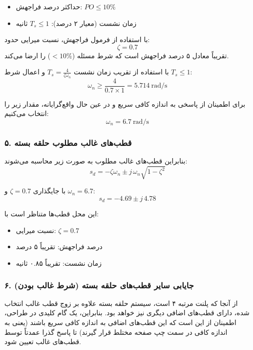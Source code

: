 \documentclass[a4paper]{article}
\begin{document}
\begin{itemize}
	\item حداکثر درصد فراجهش: $PO \le 10\%$
	\item زمان نشست (معیار ۲ درصد): $T_s \le 1$ ثانیه
\end{itemize}

با استفاده از فرمول فراجهش، نسبت میرایی حدود:
\[
\zeta = 0.7
\]
تقریباً معادل ۵ درصد فراجهش است که شرط مسئله ($<10\%$) را ارضا می‌کند.

با استفاده از تقریب زمان نشست $T_s = \frac{4}{\zeta \omega_n}$ و اعمال شرط $T_s \le 1$:
\[
\omega_n \ge \frac{4}{0.7 \times 1} = 5.714 \ \text{rad/s}
\]

برای اطمینان از پاسخی به اندازه کافی سریع و در عین حال واقع‌گرایانه، مقدار زیر را انتخاب می‌کنیم:
\[
\omega_n = 6.7 \ \text{rad/s}
\]

\subsubsection*{۵. قطب‌های غالب مطلوب حلقه بسته}

بنابراین قطب‌های غالب مطلوب به صورت زیر محاسبه می‌شوند:
\[
s_d = -\zeta \omega_n \pm j\,\omega_n\sqrt{1-\zeta^2}
\]

با جایگذاری $\zeta = 0.7$ و $\omega_n = 6.7$:
\[
s_d = -4.69 \pm j\,4.78
\]

این محل قطب‌ها متناظر است با:
\begin{itemize}
	\item نسبت میرایی: $\zeta = 0.7$
	\item درصد فراجهش: تقریباً ۵ درصد
	\item زمان نشست: تقریباً ۰.۸۵ ثانیه
\end{itemize}

\subsubsection*{۶. جایابی سایر قطب‌های حلقه بسته (شرط غالب بودن)}

از آنجا که پلنت مرتبه ۴ است، سیستم حلقه بسته علاوه بر زوج قطب غالب انتخاب شده، دارای قطب‌های اضافی دیگری نیز خواهد بود. بنابراین، یک گام کلیدی در طراحی، اطمینان از این است که این قطب‌های اضافی به اندازه کافی سریع باشند (یعنی به اندازه کافی در سمت چپ صفحه مختلط قرار گیرند) تا پاسخ گذرا عمدتاً توسط قطب‌های غالب تعیین شود.
\end{document}
